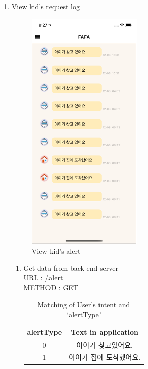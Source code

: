 \documentclass[conference]{IEEEtran}
\begin{document}
\begin{enumerate}
    \item View kid’s request log
    \begin{figure}[htbp]
    \centerline{\includegraphics{images/f3.png}}
    \caption{View kid’s alert}
    \end{figure}
    
    \begin{enumerate}
        \item Get data from back-end server\\
	    URL : /alert\\
	    METHOD : GET
	    \begin{table}[htbp]
	    \caption{Matching of User’s intent and ‘alertType’}
	    \begin{center}
        \begin{tabular}{|c|c|}
        \hline
        alertType & Text in application \\ \hline
        0         & 아이가 찾고있어요.          \\ \hline
        1         & 아이가 집에 도착했어요.       \\ \hline
        \end{tabular}
        \end{center}
        \end{table}
    \end{enumerate}
\end{enumerate}
\end{document}
